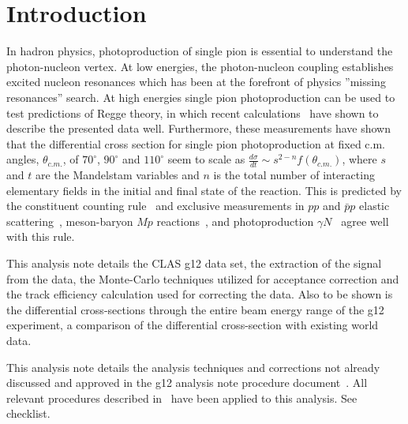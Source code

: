 \section{Introduction}\label{sec:intro}
	In hadron physics, photoproduction of single pion is essential to understand the photon-nucleon vertex. At low energies, the photon-nucleon coupling establishes excited nucleon resonances which has been at the forefront of physics ''missing resonances'' search. At high energies single pion photoproduction can be used to test predictions of Regge theory, in which recent calculations~\cite{JPAC} have shown to describe the presented data well. Furthermore, these measurements have shown that the differential cross section for single pion photoproduction at fixed c.m. angles, $\theta_{c.m.}$, of $70^{\circ}$, $90^{\circ}$ and $110^{\circ}$ seem to scale as $\frac{d\sigma}{dt} \sim s^{2-n}f(\theta_{c.m.})$, where $s$ and $t$ are the Mandelstam variables and $n$ is the total number of interacting elementary fields in the initial and final state of the reaction. This is predicted by the constituent counting rule~\cite{scaling1,scaling2} and exclusive measurements in $pp$ and  $\bar{p}p$ elastic scattering~\cite{scalingexp5, scalingexp7}, meson-baryon $M p$ reactions~\cite{scalingexp7}, and photoproduction $\gamma N$~\cite{scalingexp2, scalingexp3, scalingexp4, scalingexp6, scalingexp8, scalingexp9, scalingexp10, scalingexp11} agree well with this rule.
	
	This analysis note details the CLAS g12 data set, the extraction of the \pizT signal from the data, the Monte-Carlo techniques utilized for acceptance correction and the track efficiency calculation used for correcting the data. Also to be shown is the differential cross-sections through the entire beam energy range of the g12 experiment, a comparison of the differential cross-section with existing world data. 
	
	This analysis note details the analysis techniques and corrections not already discussed and approved in the g12 analysis note procedure document~\cite{g12note}. All relevant procedures described in~\cite{g12note} have been applied to this analysis. See checklist.
	
	
